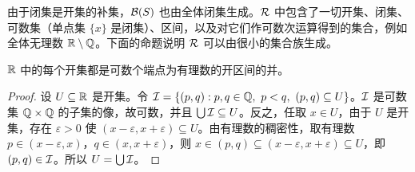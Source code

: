 由于闭集是开集的补集，$\mathcal{B}(S)$ 也由全体闭集生成。$\mathcal{R}$ 中包含了一切开集、闭集、可数集（单点集 $\{x\}$ 是闭集）、区间，以及对它们作可数次运算得到的集合，例如全体无理数 $\mathbb{R}\setminus\mathbb{Q}$。下面的命题说明 $\mathcal{R}$ 可以由很小的集合族生成。

\begin{lemma}\label{lem:set-systems:open-sets-R}
$\mathbb{R}$ 中的每个开集都是可数个端点为有理数的开区间的并。
\end{lemma}
\begin{proof}
设 $U\subseteq\mathbb{R}$ 是开集。令 $\cI=\{(p,q): p,q\in\Q,\ p<q,\ (p,q)\subseteq U\}$。$\mathcal{I}$ 是可数集 $\mathbb{Q}\times\mathbb{Q}$ 的子集的像，故可数，并且 $\bigcup\mathcal{I}\subseteq U$。反之，任取 $x\in U$，由于 $U$ 是开集，存在 $\varepsilon>0$ 使 $(x-\varepsilon,x+\varepsilon)\subseteq U$。由有理数的稠密性，取有理数 $p\in(x-\varepsilon,x)$，$q\in(x,x+\varepsilon)$，则 $x\in(p,q)\subseteq(x-\varepsilon,x+\varepsilon)\subseteq U$，即 $(p,q)\in\mathcal{I}$。所以 $U=\bigcup\mathcal{I}$。
\end{proof}

